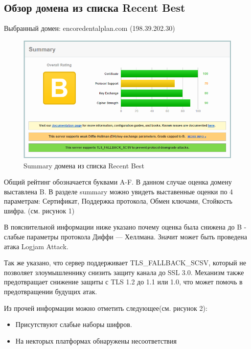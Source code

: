 \documentclass[11pt, a4paper]{article}		%
\begin{document}

\subsection{Обзор домена из списка Recent Best}

Выбранный домен: encoredentalplan.com (198.39.202.30)

\begin{figure}[h!]
\centering
\includegraphics[scale=0.8]{res/1}
\caption{Summary домена из списка Recent Best}
\end{figure}

Общий рейтинг обозначается буквами A-F. В данном случае оценка домену выставлена B. В разделе summary можно увидеть выставенные оценки по 4 параметрам: Сертификат, Поддержка протокола, Обмен ключами, Стойкость шифра. (см. рисунок 1)

В пояснительной информации ниже указано почему оценка была снижена до B - слабые параметры протокола Диффи — Хеллмана. Значит может быть проведена атака Logjam Attack.

Так же указано, что сервер поддерживает TLS\_FALLBACK\_SCSV, который не позволяет злоумышленнику снизить защиту канала до SSL 3.0. Механизм также предотвращает снижение защиты с TLS 1.2 до 1.1 или 1.0, что может помочь в предотвращении будущих атак.

Из прочей информации можно отметить следующее(см. рисунок 2):

\begin{itemize}

\item Присутствуют слабые наборы шифров.

\item На некторых платформах обнаружены несоответствия

\end{itemize}
\end{document}

